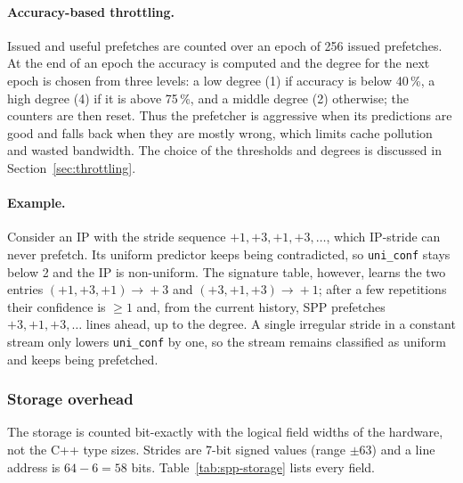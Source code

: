\documentclass[11pt,a4paper]{article}
\begin{document}
\paragraph{Accuracy-based throttling.}
Issued and useful prefetches are counted over an epoch of 256 issued prefetches. At the end
of an epoch the accuracy is computed and the degree for the next epoch is chosen from three
levels: a low degree (1) if accuracy is below 40\,\%, a high degree (4) if it is above 75\,\%, and a middle degree (2)
otherwise; the counters are then reset. Thus the prefetcher is aggressive when its predictions
are good and falls back when they are mostly wrong, which limits cache pollution and wasted
bandwidth. The choice of the thresholds and degrees is discussed in
Section~\ref{sec:throttling}.

\paragraph{Example.}
Consider an IP with the stride sequence $+1,+3,+1,+3,\dots$, which IP-stride can never prefetch.
Its uniform predictor keeps being contradicted, so \texttt{uni\_conf} stays below 2 and the IP is
non-uniform. The signature table, however, learns the two entries
$(+1,+3,+1)\!\to\!+3$ and $(+3,+1,+3)\!\to\!+1$; after a few repetitions their confidence is
$\ge 1$ and, from the current history, SPP prefetches
$+3,+1,+3,\dots$ lines ahead, up to the degree. A single irregular stride in a constant stream
only lowers \texttt{uni\_conf} by one, so the stream remains classified as uniform and keeps being
prefetched.

\subsubsection{Storage overhead}
The storage is counted bit-exactly with the logical field widths of the hardware, not the C++
type sizes. Strides are 7-bit signed values (range $\pm 63$) and a line address is
$64-6=58$ bits. Table~\ref{tab:spp-storage} lists every field.
\end{document}
